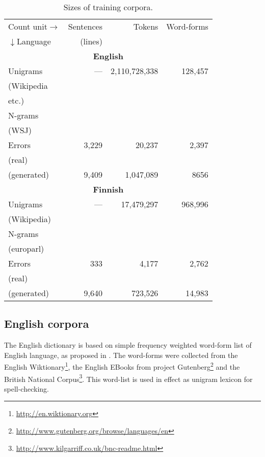 \documentclass{llncs}
\begin{document}
\begin{table}
    \caption{Sizes of training corpora.
    \label{table:corpora}}
  \begin{center}
      \begin{tabular}{lrrr}
        \hline
        Count unit$\rightarrow$ & Sentences & Tokens & Word-forms \\
        $\downarrow$Language    & (lines)   &        &  \\
        \hline
        \multicolumn{4}{c}{\textbf{English}} \\
        \hline
        Unigrams & --- & 2,110,728,338 & 128,457  \\
        (Wikipedia & & & \\
        etc.) & & & \\
        N-grams & & & \\
        (WSJ) & & & \\
        Errors & 3,229 & 20,237 & 2,397 \\
        (real) & & & \\
        (generated) & 9,409 & 1,047,089 & 8656 \\
        \hline
        \multicolumn{4}{c}{\textbf{Finnish}} \\
        \hline
        Unigrams & --- & 17,479,297 & 968,996 \\
        (Wikipedia) & & & \\
        N-grams & & & \\
        (europarl) & & & \\
        Errors & 333 & 4,177 & 2,762 \\
        (real) & & & \\
        (generated) & 9,640 & 723,526 & 14,983 \\
        \hline
      \end{tabular}
  \end{center}
\end{table}

\subsection{English corpora}

The English dictionary is based on simple frequency weighted word-form list of
English language, as proposed in \cite{norvig/2010}. The word-forms were
collected from the English Wiktionary\footnote{\url{http://en.wiktionary.org}},
the English EBooks from project
Gutenberg\footnote{\url{http://www.gutenberg.org/browse/languages/en}} and the
British National
Corpus\footnote{\url{http://www.kilgarriff.co.uk/bnc-readme.html}}. This
word-list is used in effect as unigram lexicon for spell-checking.
\end{document}

